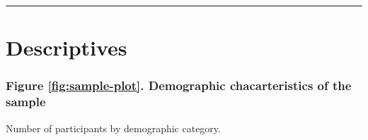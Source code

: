 \documentclass[
  bookmarksnumbered]{article}
\begin{document}
\begin{center}\rule{0.5\linewidth}{0.5pt}\end{center}

\section{Descriptives}\label{descriptives}

\subsubsection{Figure \ref{fig:sample-plot}. Demographic chacarteristics of the sample}\label{figure-reffigsample-plot.-demographic-chacarteristics-of-the-sample}

Number of participants by demographic category.
\end{document}
